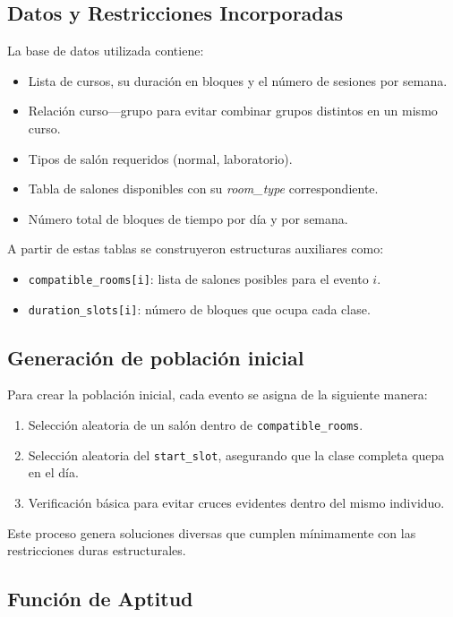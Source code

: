 \subsection{Datos y Restricciones Incorporadas}

La base de datos utilizada contiene:
\begin{itemize}
    \item Lista de cursos, su duración en bloques y el número de sesiones por semana.
    \item Relación curso---grupo para evitar combinar grupos distintos en un mismo curso.
    \item Tipos de salón requeridos (normal, laboratorio).
    \item Tabla de salones disponibles con su \textit{room\_type} correspondiente.
    \item Número total de bloques de tiempo por día y por semana.
\end{itemize}

A partir de estas tablas se construyeron estructuras auxiliares como:
\begin{itemize}
    \item \texttt{compatible\_rooms[i]}: lista de salones posibles para el evento $i$.
    \item \texttt{duration\_slots[i]}: número de bloques que ocupa cada clase.
\end{itemize}

\subsection{Generación de población inicial}

Para crear la población inicial, cada evento se asigna de la siguiente manera:

\begin{enumerate}
    \item Selección aleatoria de un salón dentro de \texttt{compatible\_rooms}.
    \item Selección aleatoria del \texttt{start\_slot}, asegurando que la clase completa quepa en el día.
    \item Verificación básica para evitar cruces evidentes dentro del mismo individuo.
\end{enumerate}

Este proceso genera soluciones diversas que cumplen mínimamente con las restricciones duras estructurales.

\subsection{Función de Aptitud}

